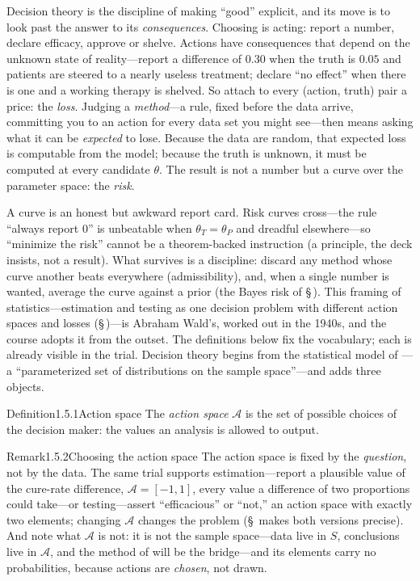 \documentclass[main.tex]{subfiles}
\begin{document}
Decision theory is the discipline of making ``good'' explicit, and its move is to look past
the answer to its \emph{consequences}. Choosing is acting: report a number, declare efficacy,
approve or shelve. Actions have consequences that depend on the unknown state of
reality---report a difference of $0.30$ when the truth is $0.05$ and patients are steered to a
nearly useless treatment; declare ``no effect'' when there is one and a working therapy is
shelved. So attach to every (action, truth) pair a price: the \emph{loss}. Judging a
\emph{method}---a rule, fixed before the data arrive, committing you to an action for every
data set you might see---then means asking what it can be \emph{expected} to lose. Because the
data are random, that expected loss is computable from the model; because the truth is
unknown, it must be computed at every candidate $\theta$. The result is not a number but a
curve over the parameter space: the \emph{risk}.

A curve is an honest but awkward report card. Risk curves cross---the rule ``always report
$0$'' is unbeatable when $\theta_T=\theta_P$ and dreadful elsewhere---so ``minimize the risk''
cannot be a theorem-backed instruction (a principle, the deck insists, not a result). What
survives is a discipline: discard any method whose curve another beats everywhere
(admissibility), and, when a single number is wanted, average the curve against a prior (the
Bayes risk of \S\,). This framing of statistics---estimation and testing as one
decision problem with different action spaces and losses (\S\,)---is Abraham Wald's,
worked out in the 1940s, and the course adopts it from the outset. The definitions below fix
the vocabulary; each is already visible in the trial. Decision theory begins from the
statistical model of ---a ``parameterized set of distributions on the sample
space''---and adds three objects. 

\begin{Obj}{Definition}{1.5.1}{Action space}
The \emph{action space} $\mathcal{A}$ is the set of possible choices of the decision maker:
the values an analysis is allowed to output.
\end{Obj}

\begin{ObjL}{Remark}{1.5.2}{Choosing the action space}
The action space is fixed by the \emph{question}, not by the data. The same trial supports
estimation---report a plausible value of the cure-rate difference, $\mathcal{A}=[-1,1]$, every
value a difference of two proportions could take---or testing---assert ``efficacious'' or
``not,'' an action space with exactly two elements; changing $\mathcal{A}$ changes the problem
(\S\, makes both versions precise). And note what $\mathcal{A}$ is not: it is not
the sample space---data live in $S$, conclusions live in $\mathcal{A}$, and the method of
 will be the bridge---and its elements carry no probabilities, because actions are
\emph{chosen}, not drawn.
\end{ObjL}
\end{document}
